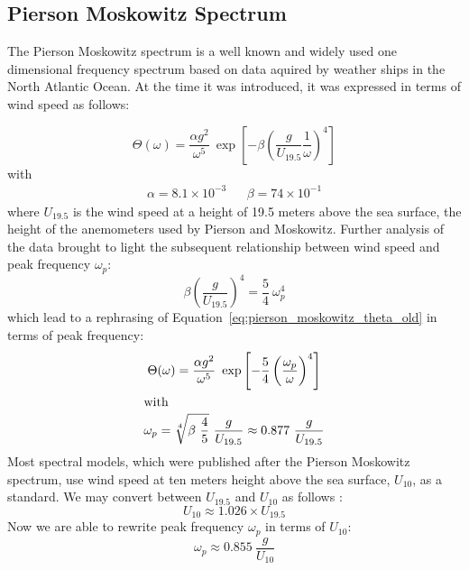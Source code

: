 \subsection{Pierson Moskowitz Spectrum}
\label{sec:pierson_moskowitz}
%
The Pierson Moskowitz spectrum \citep{article:PiersonMoskowitz1964} is a well 
known and widely used one dimensional frequency spectrum based on data aquired 
by weather ships in the North Atlantic Ocean. At the time it was introduced, 
it was expressed in terms of wind speed as follows:

\begin{equation}
\label{eq:pierson_moskowitz_theta_old}
 \Theta(\omega) = \frac{\alpha
g^2}{\omega^5}~\exp\left[-\beta\left(\frac{g}{U_{19.5}}\frac{1}{\omega}
\right)^4\right ]
\end{equation}
with
\begin{align*}
\alpha = 8.1 \times 10^{-3} && \beta = 74 \times 10^{-1}
\end{align*}
where $U_{19.5}$ is the wind speed at a height of 19.5 meters above the sea
surface, the height of the anemometers used by Pierson and Moskowitz. Further
analysis of the data \citep{alves:2003} brought to light the subsequent
relationship between wind speed and peak frequency $\omega_p$:
\begin{equation*}
 \beta\left(\frac{g}{U_{19.5}}\right)^4 = \frac{5}{4}~\omega_p^4
\end{equation*}
which lead to a rephrasing of Equation~\ref{eq:pierson_moskowitz_theta_old} in 
terms of peak frequency:
\begin{gather*}
 \Theta(\omega) = \frac{\alpha
g^2}{\omega^5}~\exp\left[-\frac{5}{4}\left(\frac{\omega_p}{\omega}
\right)^4\right ] \label{eq:pierson_moskowitz_theta}\\
\intertext{with}
\omega_p = \sqrt[4]{\beta~\frac{4}{5}}~\frac{g}{U_{19.5}} \approx
0.877~\frac{g}{U_{19.5}}
\end{gather*}
Most spectral models, which were published after the Pierson Moskowitz spectrum,
use wind speed at ten meters height above the sea surface, $U_{10}$, as a 
standard. We may convert between $U_{19.5}$ and $U_{10}$ as follows
\citep{alves:2003}:
\begin{equation}
 U_{10} \approx 1.026\times U_{19.5}
\end{equation}
Now we are able to rewrite peak frequency $\omega_p$ in terms of $U_{10}$:
\begin{equation}
\label{eq:pm_omega_p_u10}
 \omega_p \approx 0.855~\frac{g}{U_{10}}
\end{equation}

